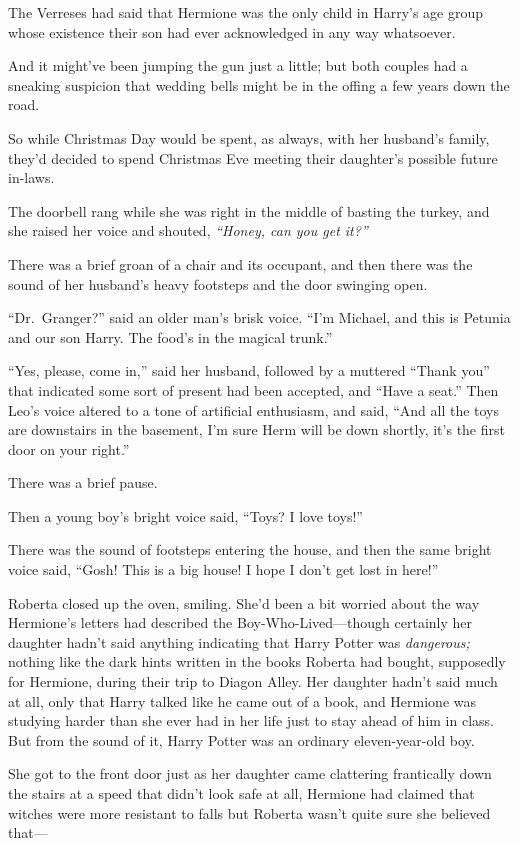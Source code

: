 The Verreses had said that Hermione was the only child in Harry's age
group whose existence their son had ever acknowledged in any way
whatsoever.

And it might've been jumping the gun just a little; but both couples had
a sneaking suspicion that wedding bells might be in the offing a few
years down the road.

So while Christmas Day would be spent, as always, with her husband's
family, they'd decided to spend Christmas Eve meeting their daughter's
possible future in-laws.

The doorbell rang while she was right in the middle of basting the
turkey, and she raised her voice and shouted, \emph{``Honey, can you get
it?''}

There was a brief groan of a chair and its occupant, and then there was
the sound of her husband's heavy footsteps and the door swinging open.

``Dr.~Granger?'' said an older man's brisk voice. ``I'm Michael, and
this is Petunia and our son Harry. The food's in the magical trunk.''

``Yes, please, come in,'' said her husband, followed by a muttered
``Thank you'' that indicated some sort of present had been accepted, and
``Have a seat.'' Then Leo's voice altered to a tone of artificial
enthusiasm, and said, ``And all the toys are downstairs in the basement,
I'm sure Herm will be down shortly, it's the first door on your right.''

There was a brief pause.

Then a young boy's bright voice said, ``Toys? I love toys!''

There was the sound of footsteps entering the house, and then the same
bright voice said, ``Gosh! This is a big house! I hope I don't get lost
in here!''

Roberta closed up the oven, smiling. She'd been a bit worried about the
way Hermione's letters had described the Boy-Who-Lived---though
certainly her daughter hadn't said anything indicating that Harry Potter
was \emph{dangerous;} nothing like the dark hints written in the books
Roberta had bought, supposedly for Hermione, during their trip to Diagon
Alley. Her daughter hadn't said much at all, only that Harry talked like
he came out of a book, and Hermione was studying harder than she ever
had in her life just to stay ahead of him in class. But from the sound
of it, Harry Potter was an ordinary eleven-year-old boy.

She got to the front door just as her daughter came clattering
frantically down the stairs at a speed that didn't look safe at all,
Hermione had claimed that witches were more resistant to falls but
Roberta wasn't quite sure she believed that---

